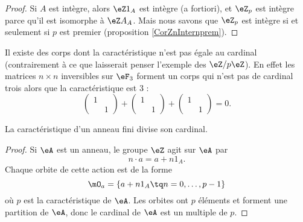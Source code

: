 \begin{proof}
    Si \( A\) est intègre, alors \( \eZ 1_A\) est intègre (a fortiori), et \( \eZ_p\) est intègre parce qu'il est isomorphe à \( \eZ A_A\). Mais nous savons que \( \eZ_p\) est intègre si et seulement si \( p\) est premier (proposition \ref{CorZnInternprem}).
\end{proof}

\begin{example}
    Il existe des corps dont la caractéristique n'est pas égale au cardinal (contrairement à ce que laisserait penser l'exemple des \( \eZ/p\eZ\)). En effet les matrices \( n\times n\) inversibles sur \( \eF_{3}\) forment un corps qui n'est pas de cardinal trois alors que la caractéristique est \( 3\) :
    \begin{equation}
        \begin{pmatrix}
            1    &       \\ 
                &   1    
            \end{pmatrix}+\begin{pmatrix}
                1    &       \\ 
                    &   1    
                \end{pmatrix}+\begin{pmatrix}
                    1    &       \\ 
                        &   1    
                \end{pmatrix}=0.
    \end{equation}
\end{example}

\begin{proposition}     \label{PropGExaUK}
    La caractéristique d'un anneau fini divise son cardinal.
\end{proposition}

\begin{proof}
    Si \( \eA\) est un anneau, le groupe \( \eZ\) agit sur \( \eA\) par
    \begin{equation}
        n\cdot a=a+n1_A.
    \end{equation}
    Chaque orbite de cette action est de la forme
    \begin{equation}
        \mO_a=\{ a+n1_A\tq n=0,\ldots, p-1 \}
    \end{equation}
    où \( p\) est la caractéristique de \( \eA\). Les orbites ont \( p\) éléments et forment une partition de \( \eA\), donc le cardinal de \( \eA\) est un multiple de \( p\).
\end{proof}

